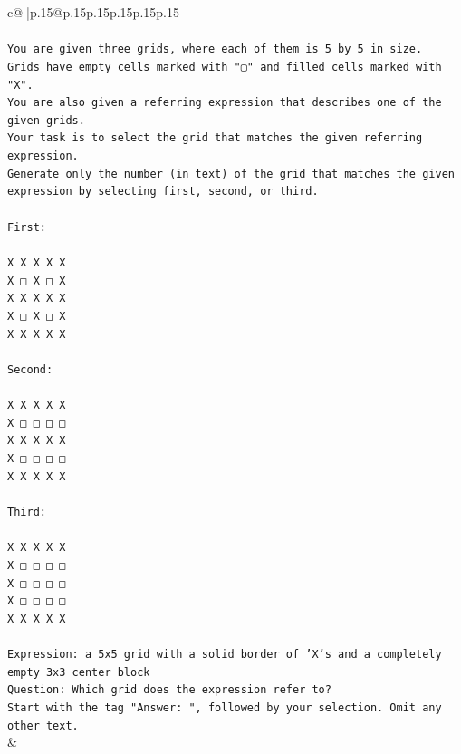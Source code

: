 \documentclass{article}
\begin{document}
{\begin{supertabular}{c@{$\;$}|p{.15\linewidth}@{}p{.15\linewidth}p{.15\linewidth}p{.15\linewidth}p{.15\linewidth}p{.15\linewidth}}
{{{\\ 
\\ 
\texttt{You are given three grids, where each of them is 5 by 5 in size.} \\
\texttt{Grids have empty cells marked with "▢" and filled cells marked with "X".} \\
\texttt{You are also given a referring expression that describes one of the given grids.} \\
\texttt{Your task is to select the grid that matches the given referring expression.} \\
\texttt{Generate only the number (in text) of the grid that matches the given expression by selecting first, second, or third.} \\
\\ 
\texttt{First:} \\
\\ 
\texttt{X X X X X} \\
\texttt{X □ X □ X} \\
\texttt{X X X X X} \\
\texttt{X □ X □ X} \\
\texttt{X X X X X} \\
\\ 
\texttt{Second:} \\
\\ 
\texttt{X X X X X} \\
\texttt{X □ □ □ □} \\
\texttt{X X X X X} \\
\texttt{X □ □ □ □} \\
\texttt{X X X X X} \\
\\ 
\texttt{Third:} \\
\\ 
\texttt{X X X X X} \\
\texttt{X □ □ □ □} \\
\texttt{X □ □ □ □} \\
\texttt{X □ □ □ □} \\
\texttt{X X X X X} \\
\\ 
\texttt{Expression: a 5x5 grid with a solid border of 'X's and a completely empty 3x3 center block} \\
\texttt{Question: Which grid does the expression refer to?} \\
\texttt{Start with the tag "Answer: ", followed by your selection. Omit any other text.} \\
            }
        }
    }
    & \\ \\


\end{supertabular}}
\end{document}
